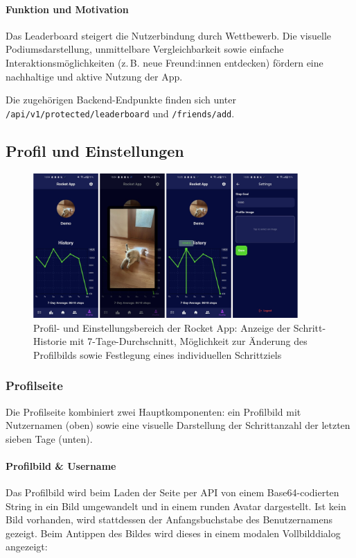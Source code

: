 \documentclass[11pt,a4paper]{article}
\begin{document}
\paragraph{Funktion und Motivation}
Das Leaderboard steigert die Nutzerbindung durch Wettbewerb. Die visuelle Podiumsdarstellung, unmittelbare Vergleichbarkeit sowie einfache Interaktionsmöglichkeiten (z.\,B. neue Freund:innen entdecken) fördern eine nachhaltige und aktive Nutzung der App.

\vspace{1em}
Die zugehörigen Backend-Endpunkte finden sich unter \texttt{/api/v1/protected/leaderboard} und \texttt{/friends/add}.

\subsection{Profil und Einstellungen}

\begin{figure}[H]
    \centering
    \includegraphics[width=0.9\textwidth]{images/apps/profile-settings-page.jpg}
    \caption{Profil- und Einstellungsbereich der Rocket App: Anzeige der Schritt-Historie mit 7-Tage-Durchschnitt, Möglichkeit zur Änderung des Profilbilds sowie Festlegung eines individuellen Schrittziels}
    \label{fig:validation-workflow}
\end{figure}

\subsubsection{Profilseite}

Die Profilseite kombiniert zwei Hauptkomponenten: ein Profilbild mit Nutzernamen (oben) sowie eine visuelle Darstellung der Schrittanzahl der letzten sieben Tage (unten).

\paragraph{Profilbild \& Username}
Das Profilbild wird beim Laden der Seite per API von einem Base64-codierten String in ein Bild umgewandelt und in einem runden Avatar dargestellt. Ist kein Bild vorhanden, wird stattdessen der Anfangsbuchstabe des Benutzernamens gezeigt. Beim Antippen des Bildes wird dieses in einem modalen Vollbilddialog angezeigt:
\end{document}
